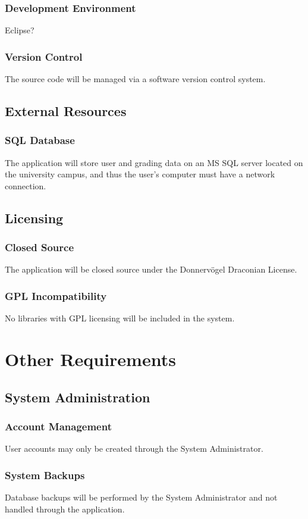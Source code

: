 \documentclass{article}
\begin{document}
\subsubsection{Development Environment}
Eclipse?
\subsubsection{Version Control}
The source code will be managed via a software version control system.
\subsection{External Resources}
\subsubsection{SQL Database}
The application will store user and grading data on an MS SQL server located on
the university campus, and thus the user's computer must have a network connection.
\subsection{Licensing}
\subsubsection{Closed Source}
The application will be closed source under the Donnervögel Draconian License.
\subsubsection{GPL Incompatibility}
No libraries with GPL licensing will be included in the system.

\section{Other Requirements}
\subsection{System Administration}
\subsubsection{Account Management}
User accounts may only be created through the System Administrator.
\subsubsection{System Backups}
Database backups will be performed by the System Administrator and not handled
through the application.
\end{document}

